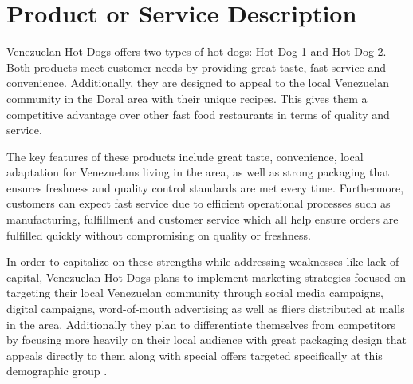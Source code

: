 

\section{Product or Service Description}\label{sec:prodservdesc}

Venezuelan Hot Dogs offers two types of hot dogs: Hot Dog 1 and Hot Dog 2. Both products meet customer needs by providing great taste, fast service and convenience. Additionally, they are designed to appeal to the local Venezuelan community in the Doral area with their unique recipes. This gives them a competitive advantage over other fast food restaurants in terms of quality and service. 

The key features of these products include great taste, convenience, local adaptation for Venezuelans living in the area, as well as strong packaging that ensures freshness and quality control standards are met every time. Furthermore, customers can expect fast service due to efficient operational processes such as manufacturing, fulfillment and customer service which all help ensure orders are fulfilled quickly without compromising on quality or freshness. 

In order to capitalize on these strengths while addressing weaknesses like lack of capital, Venezuelan Hot Dogs plans to implement marketing strategies focused on targeting their local Venezuelan community through social media campaigns, digital campaigns, word-of-mouth advertising as well as fliers distributed at malls in the area. Additionally they plan to differentiate themselves from competitors by focusing more heavily on their local audience with great packaging design that appeals directly to them along with special offers targeted specifically at this demographic group . 

